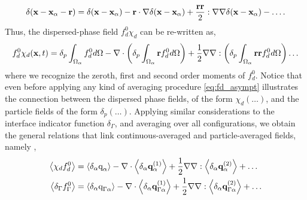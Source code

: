 \begin{equation}
\delta(\textbf{x}- \textbf{x}_\alpha - \textbf{r}) = \delta(\textbf{x}- \textbf{x}_\alpha) - \textbf{r}\cdot\mathbf{\nabla} \delta(\textbf{x} - \textbf{x}_\alpha) + \frac{\textbf{rr}}{2}:\mathbf{\nabla}\mathbf{\nabla}\delta(\textbf{x}- \textbf{x}_\alpha) - \ldots.
\end{equation}
Thus, the dispersed-phase field $f_d^0\chi_d$ can be re-written as, 
\begin{equation}
    f^0_d \chi_d(\textbf{x},t)
    =\delta_p\intO{f^0_d}
    - \div\left(\delta_p\intO{\textbf{r} f^0_d}\right)
    + \frac{1}{2}\grad\grad :\left(\delta_p\intO{\textbf{rr} f^0_d}\right)
    \ldots 
    \label{eq:fd_asympt}
\end{equation}
where we recognize the zeroth, first and second order moments of $f_d^0$. 
Notice that even before applying any kind of averaging procedure \ref{eq:fd_asympt}  illustrates the connection between the dispersed phase fields, of the form $\chi_d(\ldots)$, and the particle fields of the form $\delta_p(\ldots)$. 
Applying similar considerations to the interface indicator function $\delta_\Gamma$, and averaging over all configurations, we obtain the general relations that link continuous-averaged and particle-averaged fields, namely \citep{lhuillier1992ensemble,lhuillier1998,lhuillier2000bilan}, 
\begin{align}
    \avg{\chi_df_d^0} 
    &=  \pavg{\text q_\alpha}
        - \div  
        \pavg{\textbf{q}_\alpha^{(1)}}        
        + \frac{1}{2} \grad\grad : \pavg{\textbf{q}_{\alpha}^{(2)}}
        + \ldots  \label{eq:f_exp_chi} \\
    \avg{\delta_\Gamma  f_\Gamma ^0} 
    &=  \pavg{\text q_{\Gamma \alpha}}        
        - \div \pavg{\textbf{q}_{\Gamma\alpha}^{(1)}}
        + \frac{1}{2} \grad\grad : \pavg{\textbf{q}_{\Gamma\alpha}^{(2)}}
        + \ldots  
    \label{eq:f_exp_delta}
\end{align}
